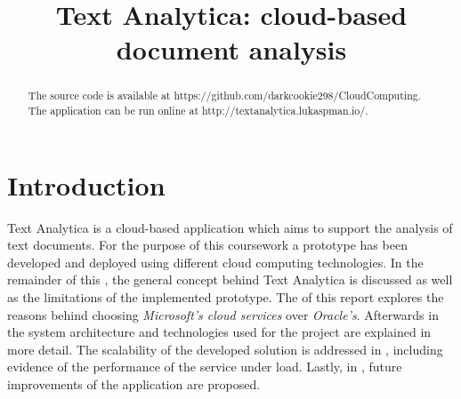 \documentclass[conference]{IEEEtran}
\begin{document}
\title{Text Analytica: cloud-based document analysis\\}

\author{
\and
{}
}

\maketitle

\begin{abstract}
The source code is available at https://github.com/darkcookie298/CloudComputing. The application can be run online at http://textanalytica.lukaspman.io/.
\end{abstract}

\section{Introduction}
\label{sec:intro}
Text Analytica is a cloud-based application which aims to support the analysis of text documents. For the purpose of this coursework a prototype has been developed and deployed using different cloud computing technologies. In the remainder of this , the general concept behind Text Analytica is discussed as well as the limitations of the implemented prototype. The  of this report explores the reasons behind choosing \textit{Microsoft's cloud services} over \textit{Oracle's}. Afterwards in  the system architecture and technologies used for the project are explained in more detail. The scalability of the developed solution is addressed in , including evidence of the performance of the service under load. Lastly, in , future improvements of the application are proposed.
\end{document}
